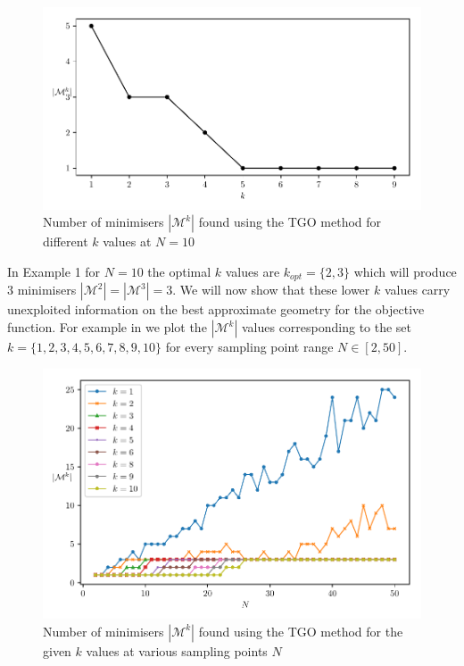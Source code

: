 \begin{figure}
\centerline{\includegraphics[scale=1.0]{./Fig2.pdf}}
{\caption{Number of minimisers $|\mathcal{M}^k|$ found using the TGO method for different $k$ values at $N = 10$}  \label{fig:min}}
\end{figure}

In Example 1 for $N = 10$ the optimal $k$ values are $k_{opt}=\{2, 3\}$ which will produce 3 minimisers $|\mathcal{M}^2| = |\mathcal{M}^3| = 3$. We will now show that these lower $k$ values carry unexploited information on the best approximate geometry for the objective function. For example in  we plot the $|\mathcal{M}^k|$ values corresponding to the set $k = \{1, 2, 3, 4, 5, 6, 7, 8, 9, 10\}$ for every sampling point range $N \in [2, 50]$.

\begin{figure} 
\centerline{\includegraphics[scale=1.0]{./Fig3.pdf}}
{\caption{Number of minimisers $|\mathcal{M}^k|$ found using the TGO method for the given $k$ values at various sampling points $N$} \label{fig:mink}}
\end{figure}

